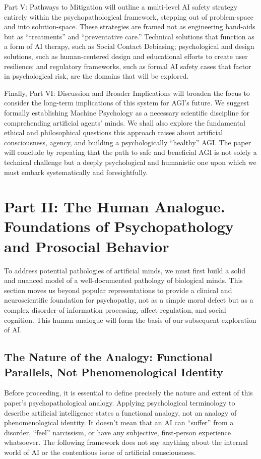 \documentclass{article}
\begin{document}
Part V: Pathways to Mitigation will outline a multi-level AI safety strategy entirely within the psychopathological framework, stepping out of problem-space and into solution-space. These strategies are framed not as engineering band-aids but as “treatments” and “preventative care.” Technical solutions that function as a form of AI therapy, such as Social Contact Debiasing; psychological and design solutions, such as human-centered design and educational efforts to create user resilience; and regulatory frameworks, such as formal AI safety cases that factor in psychological risk, are the domains that will be explored.

Finally, Part VI: Discussion and Broader Implications will broaden the focus to consider the long-term implications of this system for AGI’s future. We suggest formally establishing Machine Psychology as a necessary scientific discipline for comprehending artificial agents’ minds. We shall also explore the fundamental ethical and philosophical questions this approach raises about artificial consciousness, agency, and building a psychologically “healthy” AGI. The paper will conclude by repeating that the path to safe and beneficial AGI is not solely a technical challenge but a deeply psychological and humanistic one upon which we must embark systematically and foresightfully.
\section{Part II: The Human Analogue. Foundations of Psychopathology and Prosocial Behavior}
To address potential pathologies of artificial minds, we must first build a solid and nuanced model of a well-documented pathology of biological minds. This section moves us beyond popular representations to provide a clinical and neuroscientific foundation for psychopathy, not as a simple moral defect but as a complex disorder of information processing, affect regulation, and social cognition. This human analogue will form the basis of our subsequent exploration of AI.
\subsection{The Nature of the Analogy: Functional Parallels, Not Phenomenological Identity}
Before proceeding, it is essential to define precisely the nature and extent of this paper's psychopathological analogy. Applying psychological terminology to describe artificial intelligence states a functional analogy, not an analogy of phenomenological identity. It doesn’t mean that an AI can “suffer” from a disorder, “feel” narcissism, or have any subjective, first-person experience whatsoever. The following framework does not say anything about the internal world of AI or the contentious issue of artificial consciousness.
\end{document}
